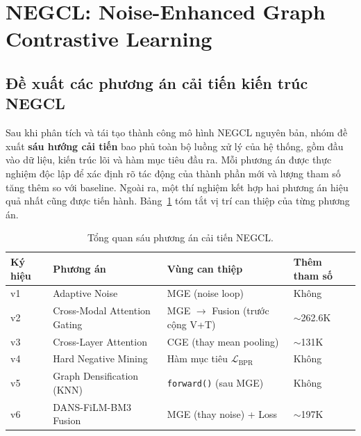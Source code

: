 
\section{NEGCL: Noise-Enhanced Graph Contrastive Learning}

\subsection{Đề xuất các phương án cải tiến kiến trúc NEGCL}

Sau khi phân tích và tái tạo thành công mô hình NEGCL nguyên bản, nhóm đề xuất \textbf{sáu hướng cải tiến} bao phủ toàn bộ luồng xử lý của hệ thống, gồm đầu vào dữ liệu, kiến trúc lõi và hàm mục tiêu đầu ra. Mỗi phương án được thực nghiệm độc lập để xác định rõ tác động của thành phần mới và lượng tham số tăng thêm so với baseline. Ngoài ra, một thí nghiệm kết hợp hai phương án hiệu quả nhất cũng được tiến hành. Bảng~\ref{tab:negcl_overview} tóm tắt vị trí can thiệp của từng phương án.

\begin{table}[H]
\centering
\small
\setlength{\tabcolsep}{4pt}
\caption{Tổng quan sáu phương án cải tiến NEGCL.}
\label{tab:negcl_overview}
\begin{tabularx}{\linewidth}{%
    >{\centering\arraybackslash}p{1.0cm}
    >{\raggedright\arraybackslash}p{3.6cm}
    X
    >{\centering\arraybackslash}p{2.3cm}}
\toprule
\textbf{Ký hiệu} & \textbf{Phương án} & \textbf{Vùng can thiệp} & \textbf{Thêm tham số} \\
\midrule
v1 & Adaptive Noise              & MGE (noise loop)                    & Không \\
v2 & Cross-Modal Attention Gating & MGE $\to$ Fusion (trước cộng V+T) & $\sim$262.6K \\
v3 & Cross-Layer Attention        & CGE (thay mean pooling)            & $\sim$131K \\
v4 & Hard Negative Mining         & Hàm mục tiêu $\mathcal{L}_{\text{BPR}}$ & Không \\
v5 & Graph Densification (KNN)   & \texttt{forward()} (sau MGE)       & Không \\
v6 & DANS-FiLM-BM3 Fusion        & MGE (thay noise) + Loss            & $\sim$197K \\
\bottomrule
\end{tabularx}
\end{table}

